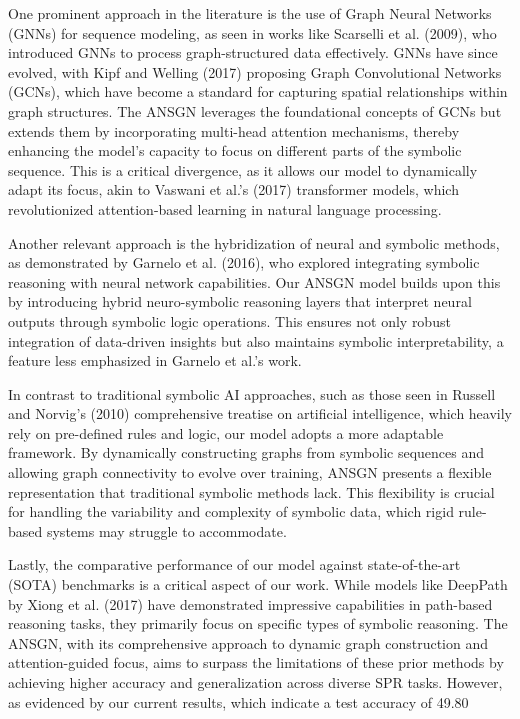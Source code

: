 \documentclass{article}
\begin{document}
One prominent approach in the literature is the use of Graph Neural Networks (GNNs) for sequence modeling, as seen in works like Scarselli et al. (2009), who introduced GNNs to process graph-structured data effectively. GNNs have since evolved, with Kipf and Welling (2017) proposing Graph Convolutional Networks (GCNs), which have become a standard for capturing spatial relationships within graph structures. The ANSGN leverages the foundational concepts of GCNs but extends them by incorporating multi-head attention mechanisms, thereby enhancing the model's capacity to focus on different parts of the symbolic sequence. This is a critical divergence, as it allows our model to dynamically adapt its focus, akin to Vaswani et al.'s (2017) transformer models, which revolutionized attention-based learning in natural language processing.

Another relevant approach is the hybridization of neural and symbolic methods, as demonstrated by Garnelo et al. (2016), who explored integrating symbolic reasoning with neural network capabilities. Our ANSGN model builds upon this by introducing hybrid neuro-symbolic reasoning layers that interpret neural outputs through symbolic logic operations. This ensures not only robust integration of data-driven insights but also maintains symbolic interpretability, a feature less emphasized in Garnelo et al.'s work.

In contrast to traditional symbolic AI approaches, such as those seen in Russell and Norvig's (2010) comprehensive treatise on artificial intelligence, which heavily rely on pre-defined rules and logic, our model adopts a more adaptable framework. By dynamically constructing graphs from symbolic sequences and allowing graph connectivity to evolve over training, ANSGN presents a flexible representation that traditional symbolic methods lack. This flexibility is crucial for handling the variability and complexity of symbolic data, which rigid rule-based systems may struggle to accommodate.

Lastly, the comparative performance of our model against state-of-the-art (SOTA) benchmarks is a critical aspect of our work. While models like DeepPath by Xiong et al. (2017) have demonstrated impressive capabilities in path-based reasoning tasks, they primarily focus on specific types of symbolic reasoning. The ANSGN, with its comprehensive approach to dynamic graph construction and attention-guided focus, aims to surpass the limitations of these prior methods by achieving higher accuracy and generalization across diverse SPR tasks. However, as evidenced by our current results, which indicate a test accuracy of 49.80%
\end{document}
